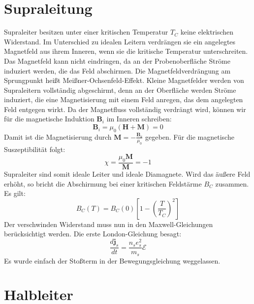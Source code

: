\documentclass[11pt]{article}
\begin{document}
\section{Supraleitung}
Supraleiter besitzen unter einer kritischen Temperatur $T_C$ keine elektrischen
Widerstand. Im Unterschied zu idealen Leitern verdrängen sie ein angelegtes
Magnetfeld aus ihrem Inneren, wenn sie die kritische Temperatur unterschreiten.
Das Magnetfeld kann nicht eindringen, da an der Probenoberfläche Ströme
induziert werden, die das Feld abschirmen. Die Magnetfeldverdrängung am
Sprungpunkt heißt Meißner-Ochsenfeld-Effekt. Kleine Magnetfelder werden von
Supraleitern vollständig abgeschirmt, denn an der Oberfläche werden Ströme
induziert, die eine Magnetisierung mit einem Feld anregen, das dem angelegten
Feld entgegen wirkt. Da der Magnetfluss vollständig verdrängt wird, können
wir für die magnetische Induktion $\bm{B}_i$ im Inneren schreiben:
\begin{equation}
  \bm{B}_i=\mu_0(\bm{H}+\bm{M})=0
\end{equation}
Damit ist die Magnetisierung durch $\bm{M}=-\frac{\bm{B}_a}{\mu_0}$ gegeben.
Für die magnetische Suszeptibilität folgt:
\begin{equation}
  \chi=\frac{\mu_0\bm{M}}{\bm{M}}=-1
\end{equation}
Supraleiter sind somit ideale Leiter und ideale Diamagnete. Wird das äußere
Feld erhöht, so bricht die Abschirmung bei einer kritischen Feldstärme $B_C$
zusammen. Es gilt:
\begin{equation}
  B_C(T)=B_C(0)\left[1-\left(\frac{T}{T_C}\right)^2\right]
\end{equation}
Der verschwinden Widerstand muss nun in den Maxwell-Gleichungen berücksichtigt
werden. Die erste London-Gleichung besagt:
\begin{equation}
  \frac{d\bm{j}_s}{dt}=\frac{n_se^2_s}{m_s}\mathcal{E}
\end{equation}
Es wurde einfach der Stoßterm in der Bewegungsgleichung weggelassen.
\section{Halbleiter}
\end{document}

